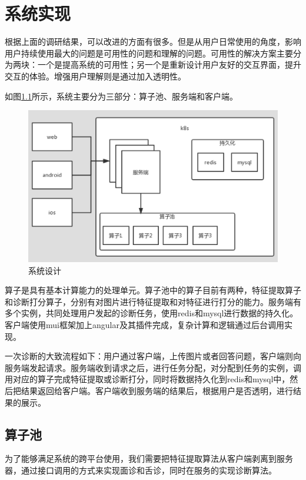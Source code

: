 \chapter{系统实现}
根据上面的调研结果，可以改进的方面有很多。但是从用户日常使用的角度，影响用户持续使用最大的问题是可用性的问题和理解的问题。可用性的解决方案主要分为两块：一个是提高系统的可用性；另一个是重新设计用户友好的交互界面，提升交互的体验。增强用户理解则是通过加入透明性。

如图\ref{fig:system}所示，系统主要分为三部分：算子池、服务端和客户端。

\begin{figure}
    \centering
    \includegraphics[width=12cm]{images/system.png}
    \caption{系统设计}
    \label{fig:system}
\end{figure}

算子是具有基本计算能力的处理单元。算子池中的算子目前有两种，特征提取算子和诊断打分算子，分别有对图片进行特征提取和对特征进行打分的能力。服务端有多个实例，共同处理用户发起的诊断任务，使用redis和mysql进行数据的持久化。客户端使用mui框架加上angular及其插件完成，复杂计算和逻辑通过后台调用实现。

一次诊断的大致流程如下：用户通过客户端，上传图片或者回答问题，客户端则向服务端发起请求。服务端收到请求之后，进行任务分配，对分配到任务的实例，调用对应的算子完成特征提取或诊断打分，同时将数据持久化到redis和mysql中，然后把结果返回给客户端。客户端收到服务端的结果后，根据用户是否透明，进行结果的展示。

\section{算子池}

为了能够满足系统的跨平台使用，我们需要把特征提取算法从客户端剥离到服务器，通过接口调用的方式来实现面诊和舌诊，同时在服务的实现诊断算法。


